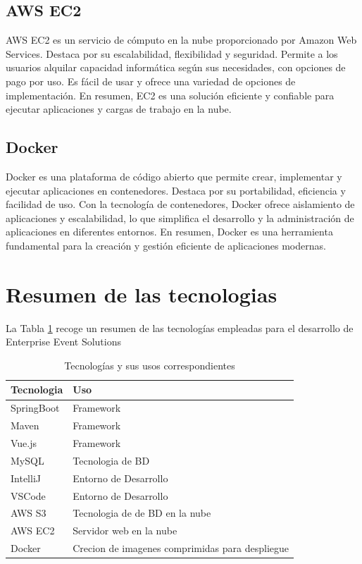 \subsection{AWS EC2}
AWS EC2 es un servicio de cómputo en la nube proporcionado por Amazon Web Services. Destaca por su escalabilidad, flexibilidad y seguridad. 
Permite a los usuarios alquilar capacidad informática según sus necesidades, con opciones de pago por uso. Es fácil de usar y ofrece una variedad 
de opciones de implementación. En resumen, EC2 es una solución eficiente y confiable para ejecutar aplicaciones y cargas de trabajo en la nube.

\subsection{Docker}
Docker\cite{Docker} es una plataforma de código abierto que permite crear, implementar y ejecutar aplicaciones en contenedores. Destaca por su portabilidad, 
eficiencia y facilidad de uso. Con la tecnología de contenedores, Docker ofrece aislamiento de aplicaciones y escalabilidad, lo que simplifica el 
desarrollo y la administración de aplicaciones en diferentes entornos. En resumen, Docker es una herramienta fundamental para la creación y gestión 
eficiente de aplicaciones modernas.

\newpage
\section{Resumen de las tecnologias}
La Tabla \ref{tabla:tecnologias_usos} recoge un resumen de las tecnologías empleadas para el desarrollo de Enterprise Event Solutions
\begin{table}[h]
\begin{tabular}{ p{3cm} l  }

    \hline
    Tecnologia& Uso \\
    \hline
    SpringBoot   & Framework \\
    Maven &   Framework \\
    Vue.js & Framework  \\
    MySQL    & Tecnologia de BD \\
    IntelliJ&   Entorno de Desarrollo  \\
    VSCode& Entorno de Desarrollo \\
    AWS S3& Tecnologia de de BD en la nube  \\
    AWS EC2& Servidor web en la nube  \\
    Docker& Crecion de imagenes comprimidas para despliegue  \\
    \hline
   \end{tabular}
   \caption{Tecnologías y sus usos correspondientes}
   \label{tabla:tecnologias_usos}
\end{table}
\newpage
